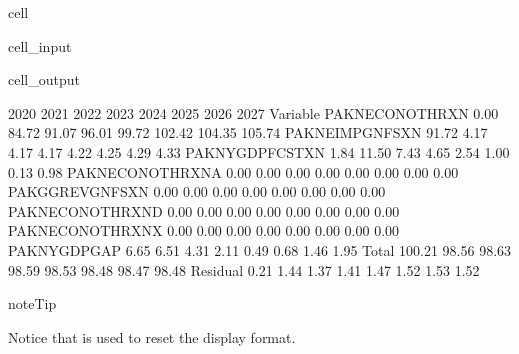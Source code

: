 \documentclass[letterpaper,10pt,english]{jupyterBook}
\begin{document}
\begin{sphinxuseclass}{cell}\begin{sphinxVerbatimInput}

\begin{sphinxuseclass}{cell_input}
\begin{sphinxVerbatim}[commandchars=\\\{\}]
 
\end{sphinxVerbatim}

\end{sphinxuseclass}\end{sphinxVerbatimInput}
\begin{sphinxVerbatimOutput}

\begin{sphinxuseclass}{cell_output}
\begin{sphinxVerbatim}[commandchars=\\\{\}]
                   2020  2021  2022  2023  2024   2025   2026   2027
Variable                                                            
PAKNECONOTHRXN    \PYGZhy{}0.00 84.72 91.07 96.01 99.72 102.42 104.35 105.74
PAKNEIMPGNFSXN    91.72 \PYGZhy{}4.17 \PYGZhy{}4.17 \PYGZhy{}4.17 \PYGZhy{}4.22  \PYGZhy{}4.25  \PYGZhy{}4.29  \PYGZhy{}4.33
PAKNYGDPFCSTXN     1.84 11.50  7.43  4.65  2.54   1.00  \PYGZhy{}0.13  \PYGZhy{}0.98
PAKNECONOTHRXN\PYGZus{}A  \PYGZhy{}0.00 \PYGZhy{}0.00 \PYGZhy{}0.00 \PYGZhy{}0.00 \PYGZhy{}0.00  \PYGZhy{}0.00  \PYGZhy{}0.00  \PYGZhy{}0.00
PAKGGREVGNFSXN    \PYGZhy{}0.00 \PYGZhy{}0.00 \PYGZhy{}0.00 \PYGZhy{}0.00 \PYGZhy{}0.00  \PYGZhy{}0.00  \PYGZhy{}0.00  \PYGZhy{}0.00
PAKNECONOTHRXN\PYGZus{}D  \PYGZhy{}0.00 \PYGZhy{}0.00 \PYGZhy{}0.00 \PYGZhy{}0.00 \PYGZhy{}0.00  \PYGZhy{}0.00  \PYGZhy{}0.00  \PYGZhy{}0.00
PAKNECONOTHRXN\PYGZus{}X  \PYGZhy{}0.00 \PYGZhy{}0.00 \PYGZhy{}0.00 \PYGZhy{}0.00 \PYGZhy{}0.00  \PYGZhy{}0.00  \PYGZhy{}0.00  \PYGZhy{}0.00
PAKNYGDPGAP\PYGZus{}       6.65  6.51  4.31  2.11  0.49  \PYGZhy{}0.68  \PYGZhy{}1.46  \PYGZhy{}1.95
Total            100.21 98.56 98.63 98.59 98.53  98.48  98.47  98.48
Residual           0.21 \PYGZhy{}1.44 \PYGZhy{}1.37 \PYGZhy{}1.41 \PYGZhy{}1.47  \PYGZhy{}1.52  \PYGZhy{}1.53  \PYGZhy{}1.52
\end{sphinxVerbatim}

\end{sphinxuseclass}\end{sphinxVerbatimOutput}

\end{sphinxuseclass}
\begin{sphinxadmonition}{note}{Tip}

\sphinxAtStartPar
Notice that  is used to reset the display format.
\end{sphinxadmonition}
\end{document}
